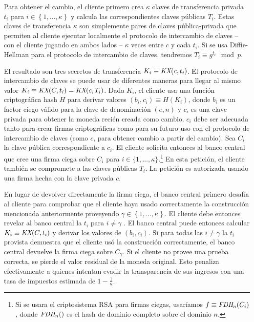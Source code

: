 \documentclass[10pt,spanish]{article}
\begin{document}
Para obtener el cambio, el cliente primero crea $\kappa$ claves de
transferencia privada $t_{i}$ para
$i \in \left\{ 1,\ldots,\kappa \right\}$ y calcula las
correspondientes claves públicas $T_{i}$. Estas claves de
transferencia $\kappa$ son simplemente pares de claves pública-privada
que permiten al cliente ejecutar localmente el protocolo de intercambio
de claves -- con el cliente jugando en ambos lados -- $\kappa$ veces
entre $c$ y cada $t_{i}$. Si se usa Diffie-Hellman para el protocolo de
intercambio de claves, tendremos
$T_{i} \equiv g^{t_{i}} \mod p$.

El resultado son tres secretos de transferencia
$K_{i} \equiv \emph{KX}(c,t_{i})$. El protocolo de
intercambio de claves se puede usar de diferentes maneras para llegar al
mismo valor
$K_{i} \equiv \emph{KX}(C,t_{i}) = \emph{KX}(c,T_{i})$.
Dada $K_{i}$, el cliente usa una función criptográfica hash $H$ para
derivar valores
$(b_{i},c_{i}) \equiv H(K_{i})$, donde
$b_{i}$ es un factor ciego válido para la clave de denominación
$(e,n)$ y $c_{i}$ es una clave privada para obtener la
moneda recién creada como cambio. $c_{i}$ debe ser adecuada tanto para
crear firmas criptográficas como para su futuro uso con el protocolo de
intercambio de claves (como $c$, para obtener cambio a partir del cambio).
Sea $C_{i}$ la clave pública correspondiente a $c_{i}$. El cliente
solicita entonces al banco central que cree una firma ciega sobre
$C_{i}$ para $i \in \{ 1,\ldots,\kappa\}$.\footnote{Si se usara el
criptosistema RSA para firmas ciegas, usaríamos
$f \equiv \emph{FDH}_{n}(C_{i})$, donde
$\emph{FDH}_{n}()$ es el hash de dominio completo sobre
el dominio $n$.} En esta petición, el cliente también se compromete a
las claves públicas $T_{i}$. La petición es autorizada usando una
firma hecha con la clave privada $c$.

En lugar de devolver directamente la firma ciega, el banco central
primero desafía al cliente para comprobar que el cliente haya usado
correctamente la construcción mencionada anteriormente proveyendo
$\gamma \in \left\{ 1,\ldots,\kappa \right\}$. El cliente debe
entonces revelar al banco central la $t_{i}$ para $i \neq \gamma$ .
El banco central puede entonces calcular
$K_{i} \equiv \emph{KX}(C,t_{i})$ y derivar los valores
de $(b_{i},c_{i})$. Si para todas las $i \neq \gamma$
la $t_{i}$ provista demuestra que el cliente usó la construcción
correctamente, el banco central devuelve la firma ciega sobre
$C_{\gamma}$. Si el cliente no provee una prueba correcta, se pierde
el valor residual de la moneda original. Esto penaliza efectivamente a
quienes intentan evadir la transparencia de sus ingresos con una tasa de
impuestos estimada de $1 - \frac{1}{\kappa}$.
\end{document}
